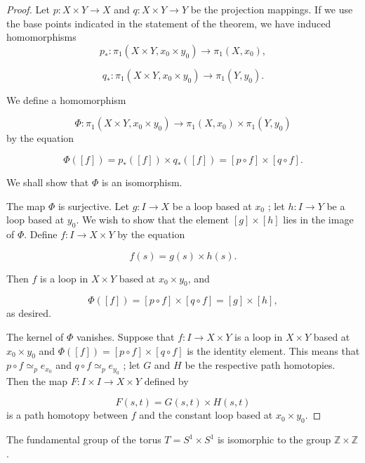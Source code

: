 \begin{proof}
Let \(p : X \times Y \rightarrow X\) and \(q : X \times Y \rightarrow Y\) be the projection mappings. If we use the base points indicated in the statement of the theorem, we have induced homomorphisms
\[
p_{ * } : {\pi }_{1}( {X \times Y,x_{0} \times {y}_{0}}) \rightarrow {\pi }_{1}( {X,x_{0}}),
\]

\[
q_{ * } : {\pi }_{1}( {X \times Y,x_{0} \times {y}_{0}}) \rightarrow {\pi }_{1}( {Y,y_{0}}).
\]

We define a homomorphism

\[
\Phi : {\pi }_{1}( {X \times Y,x_{0} \times {y}_{0}}) \rightarrow {\pi }_{1}( {X,x_{0}}) \times {\pi }_{1}( {Y,y_{0}})
\]
by the equation

\[
\Phi ( [ f] ) = p_{ * }( [ f] ) \times {q}_{ * }( [ f] ) = [ {p \circ f}] \times [ {q \circ f}] .
\]

We shall show that \(\Phi\) is an isomorphism.

The map \(\Phi\) is surjective. Let \(g : I \rightarrow X\) be a loop based at \(x_{0}\) ; let \(h : I \rightarrow Y\) be a loop based at \(y_{0}\). We wish to show that the element \([ g] \times [ h]\) lies in the image of \(\Phi\). Define \(f : I \rightarrow X \times Y\) by the equation

\[
f( s) = g( s) \times h( s).
\]

Then \(f\) is a loop in \(X \times Y\) based at \(x_{0} \times {y}_{0}\), and

\[
\Phi ( [ f] ) = [ {p \circ f}] \times [ {q \circ f}] = [ g] \times [ h] ,
\]
as desired.

The kernel of \(\Phi\) vanishes. Suppose that \(f : I \rightarrow X \times Y\) is a loop in \(X \times Y\) based at \(x_{0} \times {y}_{0}\) and \(\Phi ( [ f] ) = [ {p \circ f}] \times [ {q \circ f}]\) is the identity element. This means that \(p \circ f{ \simeq }_{p}e_{x_{0}}\) and \(q \circ f{ \simeq }_{p}e_{y_{0}}\) ; let \(G\) and \(H\) be the respective path homotopies. Then the map \(F : I \times I \rightarrow X \times Y\) defined by

\[
F( {s,t}) = G( {s,t}) \times H( {s,t})
\]
is a path homotopy between \(f\) and the constant loop based at \(x_{0} \times {y}_{0}\).
\end{proof}
\begin{corollary}
\label{cor:\thetheorem}
The fundamental group of the torus \(T = S^{1} \times {S}^{1}\) is isomorphic to the group \(\mathbb{Z} \times \mathbb{Z}\).
\end{corollary}

